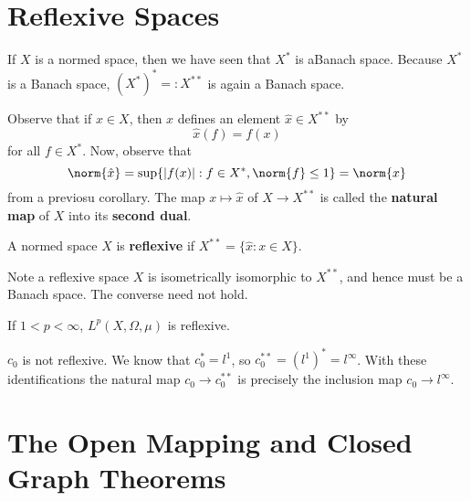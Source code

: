 \section{Reflexive Spaces}
\label{sec:reflSpace}

If $X$ is a normed space, then we have seen that $X^*$ is aBanach space. Because $X^*$ is a Banach space, $(X^*)^* =: X^{**}$ is again a Banach space.

Observe that if $x \in X$, then $x$ defines an element $\hat{x} \in X^{**}$ by $$\hat{x}(f) = f(x)$$
for all $f \in X^*$. Now, observe that $$\norm{\hat{x}} = \sup\{|f(x)|:f \in X^*,\norm{f} \leq 1\} = \norm{x}$$
from a previosu corollary. The map $x\mapsto\hat{x}$ of $X\rightarrow X^{**}$ is called the \textbf{natural map} of $X$ into its \textbf{second dual}.

\begin{defn}
    A normed space $X$ is \textbf{reflexive} if $X^{**} = \{\hat{x}:x\in X\}$.
\end{defn}

Note a reflexive space $X$ is isometrically isomorphic to $X^{**}$, and hence must be a Banach space. The converse need not hold.

\begin{eg}
    If $1 < p < \infty$, $L^p(X,\Omega,\mu)$ is reflexive.
\end{eg}

\begin{eg}
    $c_0$ is not reflexive. We know that $c_0^* = l^1$, so $c_0^{**} = (l^1)^* = l^{\infty}$. With these identifications the natural map $c_0\rightarrow c_0^{**}$ is precisely the inclusion map $c_0\rightarrow l^{\infty}$.
\end{eg}



\section{The Open Mapping and Closed Graph Theorems}
\label{sec:OpClosMaps}

